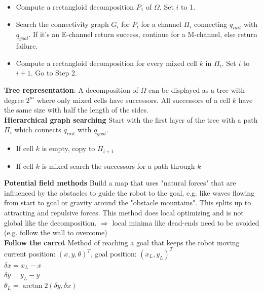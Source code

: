 \documentclass[12pt]{article}
\begin{document}
	\begin{itemize}
		\item Compute a rectangloid decomposition $P_1$ of $\Omega$. Set $i$ to 1.
		\item Search the connectivity graph $G_i$ for $P_i$ for a channel $\Pi_i$ connecting $q_{init}$ with $q_{goal}$. If it's an E-channel return success, continue for a M-channel, else return failure.
		\item Compute a rectangloid decomposition for every mixed cell $k$ in $\Pi_i$. Set $i$ to $i+1$. Go to Step 2.
	\end{itemize}
	\textbf{Tree representation}: A decomposition of $\Omega$ can be displayed as a tree with degree $2^m$ where only mixed cells have successors. All successors of a cell $k$ have the same size with half the length of the sides.\\
	\textbf{Hierarchical graph searching} Start with the first layer of the tree with a path $\Pi_i$ which connects $q_{init}$ with $q_{goal}$.
	\begin{itemize}
		\item If cell $k$ is empty, copy to $\Pi_{i+1}$
		\item If cell $k$ is mixed search the successors for a path through $k$
	\end{itemize}
	\textbf{Potential field methods} Build a map that uses "natural forces" that are influenced by the obstacles to guide the robot to the goal, e.g. like waves flowing from start to goal or gravity around the "obstacle mountains". This splits up to attracting and repulsive forces. This method does local optimizing and is not global like the decomposition. $\Rightarrow$ local minima like dead-ends need to be avoided (e.g. follow the wall to overcome)\\
	\textbf{Follow the carrot} Method of reaching a goal that keeps the robot moving\\
	current position: $(x, y, \theta)^T$, goal position: $(x_L, y_L)^T$\\
	$\delta x = x_L - x$\\
	$\delta y = y_L - y$\\
	$\theta_L = \arctan2(\delta y, \delta x)$
\end{document}
